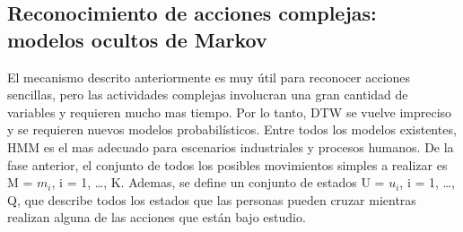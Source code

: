 \documentclass[a4paper]{article}
\begin{document}
\subsection{Reconocimiento de acciones complejas: modelos ocultos de Markov}
El mecanismo descrito anteriormente es muy útil para reconocer acciones sencillas, pero las actividades complejas involucran una gran cantidad de variables y requieren mucho mas tiempo. Por lo tanto, DTW se vuelve impreciso y se requieren nuevos modelos probabilísticos. Entre todos los modelos existentes, HMM es el mas adecuado para escenarios industriales y procesos humanos. 
De la fase anterior, el conjunto de todos los posibles movimientos simples a realizar es M = {$m_i$, i = 1, …, K}. Ademas, se define un conjunto de estados  U = {$u_i$, i = 1, …, Q}, que describe todos los estados que las personas pueden cruzar mientras realizan alguna de las acciones que están bajo estudio. 
\end{document}
